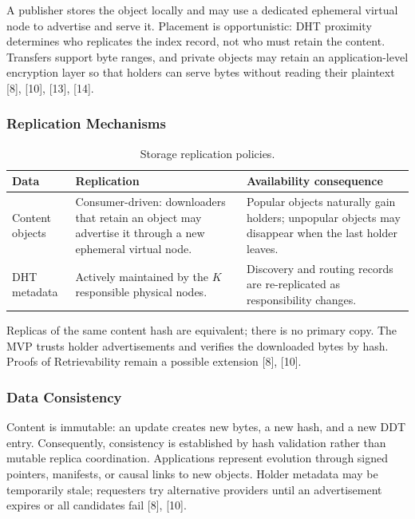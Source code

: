 \documentclass[12pt,a4paper]{article}
\begin{document}
A publisher stores the object locally and may use a dedicated ephemeral virtual node
to advertise and serve it. Placement is opportunistic: DHT proximity determines who
replicates the index record, not who must retain the content. Transfers support byte
ranges, and private objects may retain an application-level encryption layer so that
holders can serve bytes without reading their plaintext [8], [10], [13], [14].

\subsubsection{Replication Mechanisms}

\begin{table}[H]
\centering
\caption{Storage replication policies.}
\label{tab:storage-replication-policies}
\begin{tabularx}{\textwidth}{L{0.24\textwidth} Y Y}
\toprule
\textbf{Data} & \textbf{Replication} & \textbf{Availability consequence} \\
\midrule
Content objects & Consumer-driven: downloaders that retain an object may advertise
it through a new ephemeral virtual node. & Popular objects naturally gain holders;
unpopular objects may disappear when the last holder leaves. \\
DHT metadata & Actively maintained by the $K$ responsible physical nodes. &
Discovery and routing records are re-replicated as responsibility changes. \\
\bottomrule
\end{tabularx}
\end{table}

Replicas of the same content hash are equivalent; there is no primary copy. The MVP
trusts holder advertisements and verifies the downloaded bytes by hash. Proofs of
Retrievability remain a possible extension [8], [10].

\subsubsection{Data Consistency}

Content is immutable: an update creates new bytes, a new hash, and a new DDT entry.
Consequently, consistency is established by hash validation rather than mutable
replica coordination. Applications represent evolution through signed pointers,
manifests, or causal links to new objects. Holder metadata may be temporarily stale;
requesters try alternative providers until an advertisement expires or all candidates
fail [8], [10].
\end{document}
